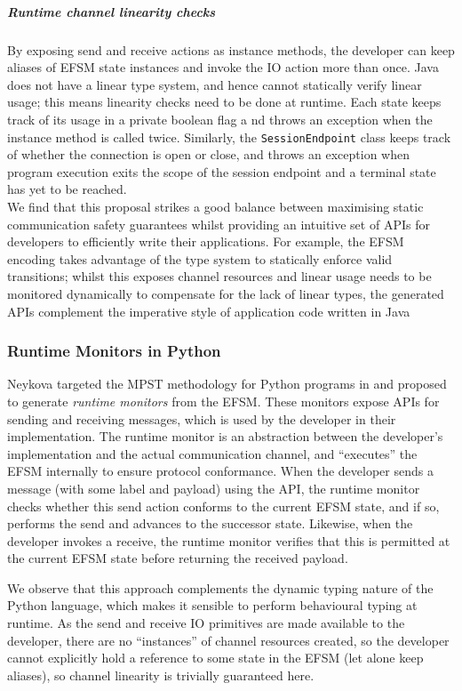 \subparagraph{Runtime channel linearity checks}
By exposing send and receive actions as instance
methods, the developer can keep aliases of EFSM state instances
and invoke the IO action more than once. Java does not
have a linear type system, and hence cannot statically
verify linear usage; this means linearity checks need to be
done at runtime.
Each state keeps track of its usage in a private boolean flag a
nd throws an exception when the instance method is called twice.
Similarly, the \texttt{SessionEndpoint} class keeps track of 
whether the connection is open or close,
and throws an exception when program execution exits the 
scope of the session endpoint and a terminal state 
has yet to be reached.\\

We find that this proposal strikes a good balance 
between maximising static communication safety guarantees 
whilst providing an intuitive set of APIs for developers 
to efficiently write their applications. 
For example, the EFSM encoding takes advantage of the type system 
to statically enforce valid transitions; whilst this
exposes channel resources and linear usage needs to be
monitored dynamically to compensate for the lack of linear types,
the generated APIs complement the 
imperative style of application code written in Java


\subsubsection{Runtime Monitors in Python}
Neykova targeted the MPST methodology 
for Python programs in \cite{Python2017} 
and proposed to generate \textit{runtime monitors} 
from the EFSM.
These monitors expose APIs for sending and receiving messages,
which is used by the developer in their implementation. 
The runtime monitor is an abstraction between the 
developer's implementation and the actual communication channel, 
and ``executes'' the EFSM internally to ensure protocol conformance. 
When the developer sends a message (with some label and payload) 
using the API, the runtime monitor checks 
whether this send action conforms to the current EFSM state, 
and if so, 
performs the send and advances to the successor state. 
Likewise, when the developer invokes a receive, 
the runtime monitor verifies that this is permitted 
at the current EFSM state before returning the received payload.

We observe that this approach complements the 
dynamic typing nature of the Python language, 
which makes it sensible to perform behavioural typing at runtime.
As the send and receive IO primitives are
made available to the developer,
there are no ``instances'' of channel resources created,
so the developer cannot explicitly hold a reference to
some state in the EFSM (let alone keep aliases),
so channel linearity is trivially guaranteed here.

